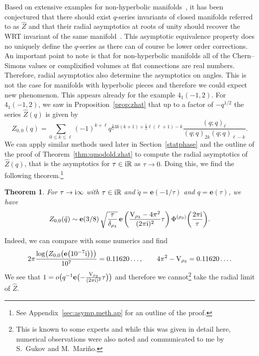 \documentclass[pdftex]{sigma}
\numberwithin{equation}{section}
\newtheorem{Theorem}{Theorem}[section]
\def\BR{\mathbb{R}}
\def\tq{\tilde{q}}
\def\e{\mathbf e}
\def\VC{\mathrm{VC}}
\def\BR{\mathbb R}
\def\tq{\tilde{q}}
\def\VC{\mathrm{V}}
\begin{document}
Based on extensive examples for non-hyperbolic manifolds~\cite{Cheng:3dmod,GukovMan,GPV,Hikami,LawrenceZag}, it has been conjectured that there should exist $q$-series invariants of closed manifolds referred to as $\widehat{Z}$ and that their radial asymptotics at roots of unity should recover the WRT invariant of the same manifold~\cite{GukovMan}. This asymptotic equivalence property does no uniquely define the $q$-series as there can of course be lower order corrections. An important point to note is that for non-hyperbolic manifolds all of the Chern--Simons values or complixified volumes at flat connections are real numbers. Therefore, radial asymptotics also determine the asymptotics on angles. This is not the case for manifolds with hyperbolic pieces and therefore we could expect new phenomenon. This appears already for the example $4_1(-1,2)$. For $4_1(-1,2)$, we saw in Proposition~\ref{prop:zhat} that up to a factor of $-q^{1/2}$ the series $\widehat{Z}(q)$ is given by
\[
 Z_{0,0}(q)
  =
 \sum_{0\leq k\leq\ell}(-1)^{k+\ell}q^{\frac{1}{2}3k(k+1)+\frac{1}{2}\ell(\ell+1)-k}\frac{(q;q)_{\ell}}{(q;q)_{2k}(q;q)_{\ell-k}} .
\]
We can apply similar methods used later in Section~\ref{statphase} and the outline of the proof of Theorem~\ref{thm:qmodold.zhat} to compute the radial asymptotics of $\widehat{Z}(q)$, that is the asymptotics for $\tau\in {\rm i}\BR$ as $\tau\rightarrow 0$. Doing this, we find the following theorem.\footnote{See Appendix~\ref{sec:asymp.meth.ap} for an outline of the proof.}
\begin{Theorem}\label{thm:zhatasym}
For $\tau\rightarrow {\rm i}\infty$ with $\tau\in {\rm i}\BR$ and $\tq=\e(-1/\tau)$ and $q=\e(\tau)$, we have
\[
 Z_{0,0}(\tq)
 \sim
 \e(3/8)\,\sqrt{\frac{\tau}{\delta_{\rho_3}}}\,\e\left(\frac{\VC_{\rho_3}-4\pi^2}{(2\pi {\rm i})^2}\tau\right)\Phi^{(\rho_{3})}\biggl(\frac{2\pi {\rm i}}{\tau}\biggr).
\]
\end{Theorem}
Indeed, we can compare with some numerics and find
\begin{align*}
 2\pi\frac{\log\bigl(Z_{0,0}\bigl(\e\bigl(10^{-7}{\rm i}\bigr)\bigr)\bigr)}{10^7}
 =0.11620\ldots,\qquad 4\pi^2-\VC_{\rho_3}
 =0.11620\ldots.
\end{align*}
We see that $1=o\bigl(q^{-1}\e\bigl(-\frac{\VC_{\rho_3}}{(2\pi {\rm i})^2}\tau\bigr)\bigr)$ and therefore we cannot\footnote{This is known to some experts and while this was given in detail here, numerical observations were also noted and communicated to me by S.~Gukov and M.~Mari\~no.} take the radial limit of $\widehat{Z}$.
\end{document}
